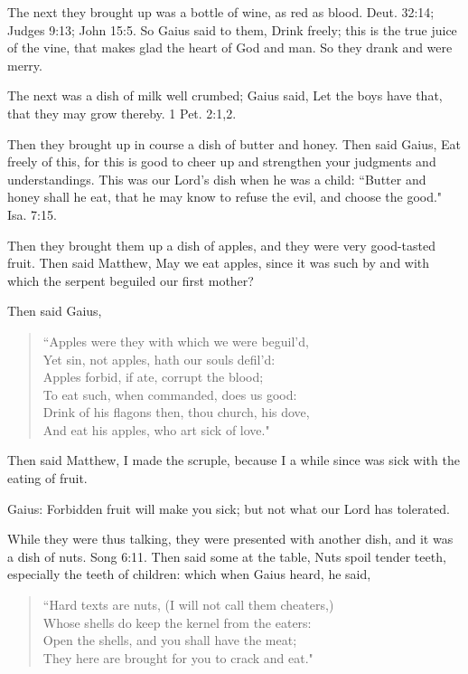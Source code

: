The next they brought up was a bottle of wine, as red as blood. Deut. 32:14; Judges 9:13; John 15:5. So Gaius said to them, Drink freely; this is the true juice of the vine, that makes glad the heart of God and man. So they drank and were merry.

The next was a dish of milk well crumbed; Gaius said, Let the boys have that, that they may grow thereby. 1 Pet. 2:1,2.

Then they brought up in course a dish of butter and honey. Then said Gaius, Eat freely of this, for this is good to cheer up and strengthen your judgments and understandings. This was our Lord's dish when he was a child: ``Butter and honey shall he eat, that he may know to refuse the evil, and choose the good." Isa. 7:15.

Then they brought them up a dish of apples, and they were very good-tasted fruit. Then said Matthew, May we eat apples, since it was such by and with which the serpent beguiled our first mother?

Then said Gaius,
\begin{verse}
``Apples were they with which we were beguil'd,\\
Yet sin, not apples, hath our souls defil'd:\\
Apples forbid, if ate, corrupt the blood;\\
To eat such, when commanded, does us good:\\
Drink of his flagons then, thou church, his dove,\\
And eat his apples, who art sick of love."\\
\end{verse}

Then said Matthew, I made the scruple, because I a while since was sick with the eating of fruit.

Gaius: Forbidden fruit will make you sick; but not what our Lord has tolerated.

While they were thus talking, they were presented with another dish, and it was a dish of nuts. Song 6:11. Then said some at the table, Nuts spoil tender teeth, especially the teeth of children: which when Gaius heard, he said,
\begin{verse}
``Hard texts are nuts, (I will not call them cheaters,)\\
Whose shells do keep the kernel from the eaters:\\
Open the shells, and you shall have the meat;\\
They here are brought for you to crack and eat."\\
\end{verse}

